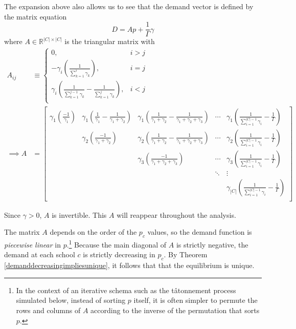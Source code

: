 \documentclass[12pt]{article}
\theoremstyle{definition}
\begin{document}
The expansion above also allows us to see that the demand vector is defined by the matrix equation
\begin{equation}D = A p + \frac{1}{\Gamma}\gamma \label{demandmatrixeq}\end{equation}
where $A\in \mathbb{R}^{|C| \times |C|}$ is the triangular matrix with
\begin{align} \label{Adef}
A_{ij} &\equiv \begin{cases}
0, & i > j \\
-\gamma_i \left(\frac{1}{ \sum_{k=1}^i \gamma_k}\right), & i=j \\
\gamma_i \left( \frac{1}{\sum_{k=1}^{j-1} \gamma_k} -  \frac{1}{\sum_{k=1}^{j} \gamma_k}\right), & i<j \\
\end{cases} \\[.8em]
\implies A &= \begin{bmatrix}
\gamma_1 \left( \frac{-1}{\gamma_1} \right) & \gamma_1 \left(\frac{1}{\gamma_1} - \frac{1}{\gamma_1 + \gamma_2} \right) & \gamma_1 \left(\frac{1}{\gamma_1 + \gamma_2} - \frac{1}{\gamma_1 + \gamma_2 + \gamma_3} \right) & \cdots &  \gamma_1 \left(\frac{1}{\sum_{i=1}^{|C| - 1}\gamma_i} - \frac{1}{\Gamma}  \right)  \\
 & \gamma_2 \left( \frac{-1}{\gamma_1 + \gamma_2} \right) & \gamma_2 \left(\frac{1}{\gamma_1 + \gamma_2} - \frac{1}{\gamma_1 + \gamma_2 + \gamma_3} \right) & \cdots &  \gamma_2 \left(\frac{1}{\sum_{i=1}^{|C| - 1}\gamma_i} - \frac{1}{\Gamma} \right)  \\
 &  & \gamma_3 \left( \frac{-1}{\gamma_1 + \gamma_2 + \gamma_3} \right) & \cdots &  \gamma_3 \left(\frac{1}{\sum_{i=1}^{|C| - 1}\gamma_i} - \frac{1}{\Gamma} \right)  \\
 & & & \ddots & \vdots \\
 &  &  &  &  \gamma_{|C|} \left(\frac{1}{\sum_{i=1}^{|C| - 1}\gamma_i} -\frac{1}{\Gamma}  \right)  \\
\end{bmatrix}\end{align}

Since $\gamma > 0$, $A$ is invertible. This $A$ will reappear throughout the analysis. 

The matrix $A$ depends on the order of the $p_c$ values, so the demand function is \emph{piecewise linear} in $p$.\footnote{In the context of an iterative schema such as the t\^{a}tonnement process simulated below, instead of sorting $p$ itself, it is often simpler to permute the rows and columns of $A$ according to the inverse of the permutation that sorts $p$.} Because the main diagonal of $A$ is strictly negative, the demand at each school $c$ is strictly decreasing in $p_c$. By Theorem \ref{demanddecreasingimpliesunique}, it follows that that the equilibrium is unique.
\end{document}
